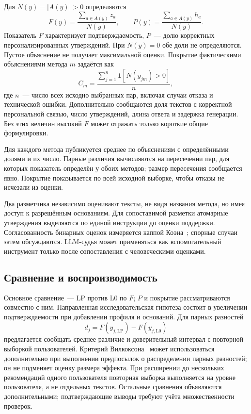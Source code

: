 \documentclass{misisarticle}
\begin{document}
Для $N(y)=|A(y)|>0$ определяются
\begin{equation}
 F(y)=\frac{\sum_{a\in A(y)}z_a}{N(y)},\qquad
 P(y)=\frac{\sum_{a\in A(y)}h_a}{N(y)}.
 \label{eq:metrics}
\end{equation}
Показатель $F$ характеризует подтверждаемость, $P$~--- долю корректных персонализированных утверждений. При $N(y)=0$ обе доли не определяются. Пустое объяснение не получает максимальной оценки. Покрытие фактическими объяснениями метода $m$ задаётся как
\begin{equation}
 C_m=\frac{\sum_{j=1}^{n}\mathbf{1}[N(y_{jm})>0]}{n},
 \label{eq:coverage}
\end{equation}
где $n$~--- число всех исходно выбранных пар, включая случаи отказа и технической ошибки. Дополнительно сообщаются доля текстов с корректной персональной связью, число утверждений, длина ответа и задержка генерации. Без этих величин высокий $F$ может отражать только короткие общие формулировки.

Для каждого метода публикуется среднее по объяснениям с определёнными долями и их число. Парные различия вычисляются на пересечении пар, для которых показатель определён у обоих методов; размер пересечения сообщается явно. Покрытие показывается по всей исходной выборке, чтобы отказы не исчезали из оценки.

Два разметчика независимо оценивают тексты, не видя названия метода, но имея доступ к разрешённым основаниям. Для сопоставимой разметки атомарные утверждения выделяются по единой инструкции до оценки поддержки. Согласованность бинарных оценок измеряется каппой Коэна~\cite{cohen}; спорные случаи затем обсуждаются. LLM-судья может применяться как вспомогательный инструмент только после сопоставления с человеческими оценками.

\subsection{Сравнение и воспроизводимость}

Основное сравнение~--- LP против L0 по $F$; $P$ и покрытие рассматриваются совместно с ним. Направленная исследовательская гипотеза состоит в увеличении подтверждаемости при добавлении профиля и оснований. Для парных разностей
\begin{equation}
 d_j=F(y_{j,\mathrm{LP}})-F(y_{j,\mathrm{L0}})
 \label{eq:paired}
\end{equation}
предлагается сообщать среднее различие и доверительный интервал с повторной выборкой пользователей. Критерий Вилкоксона~\cite{wilcoxon} может использоваться дополнительно при выполнении предпосылок о распределении парных разностей; он не подменяет оценку размера эффекта. При расширении до нескольких рекомендаций одного пользователя повторная выборка выполняется на уровне пользователя, а не отдельных текстов. Остальные сравнения объявляются дополнительными; подтверждающие выводы требуют учёта множественности проверок.
\end{document}
